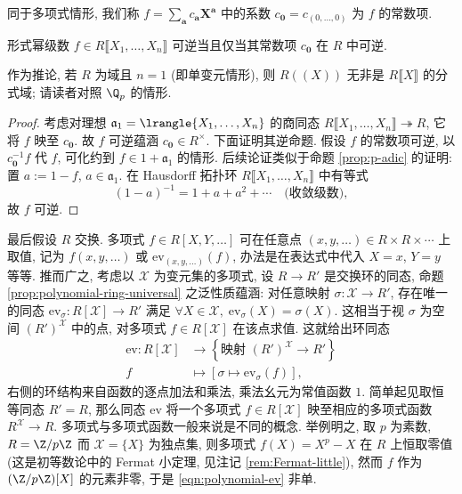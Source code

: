 同于多项式情形, 我们称 $f = \sum_{\bm{a}} c_{\bm{a}} \bm{X}^{\bm{a}}$ 中的系数 $c_{\bm{0}} = c_{(0, \ldots, 0)}$ 为 $f$ 的常数项.

\begin{proposition}
	形式幂级数 $f \in R\llbracket X_1, \ldots, X_n \rrbracket$ 可逆当且仅当其常数项 $c_{\bm{0}}$ 在 $R$ 中可逆.
\end{proposition}
作为推论, 若 $R$ 为域且 $n=1$ (即单变元情形), 则 $R(\!(X)\!)$ 无非是 $R \llbracket X \rrbracket$ 的分式域; 请读者对照 $\Q_p$ 的情形.

\begin{proof}
	考虑对理想 $\mathfrak{a}_1 = \lrangle{X_1, \ldots, X_n}$ 的商同态 $R\llbracket X_1, \ldots, X_n \rrbracket \twoheadrightarrow R$, 它将 $f$ 映至 $c_{\bm{0}}$. 故 $f$ 可逆蕴涵 $c_{\bm{0}} \in R^\times$. 下面证明其逆命题. 假设 $f$ 的常数项可逆, 以 $c_{\bm{0}}^{-1} f$ 代 $f$, 可化约到 $f \in 1 + \mathfrak{a}_1$ 的情形. 后续论证类似于命题 \ref{prop:p-adic} 的证明: 置 $a := 1 - f$, $a \in \mathfrak{a}_1$. 在 Hausdorff 拓扑环 $R \llbracket X_1, \ldots, X_n \rrbracket$ 中有等式
	\[ (1-a)^{-1} = 1 + a + a^2 + \cdots \quad \text{(收敛级数)}, \]
	故 $f$ 可逆.
\end{proof}

最后假设 $R$ 交换. 多项式 $f \in R[X,Y,\ldots]$ 可在任意点 $(x,y, \ldots) \in R \times R \times \cdots$ 上取值, 记为 $f(x,y,\ldots)$ 或 $\text{ev}_{(x,y,\ldots)}(f)$, 办法是在表达式中代入 $X=x$, $Y=y$ 等等. 推而广之, 考虑以 $\mathcal{X}$ 为变元集的多项式, 设 $R \to R'$ 是交换环的同态, 命题 \ref{prop:polynomial-ring-universal} 之泛性质蕴涵: 对任意映射 $\sigma: \mathcal{X} \to R'$, 存在唯一的同态 $\text{ev}_\sigma: R[\mathcal{X}] \to R'$ 满足 $\forall X \in \mathcal{X}, \;\text{ev}_\sigma(X) = \sigma(X)$. 这相当于视 $\sigma$ 为空间 $(R')^\mathcal{X}$ 中的点, 对多项式 $f \in R[\mathcal{X}]$ 在该点求值. 这就给出环同态
\begin{equation}\label{eqn:polynomial-ev}\begin{aligned}
	\text{ev}: R[\mathcal{X}] & \longrightarrow \left\{ \text{映射 } (R')^\mathcal{X} \to R' \right\} \\
	f & \longmapsto \left[ \sigma \mapsto \text{ev}_\sigma(f) \right],
\end{aligned}\end{equation}
右侧的环结构来自函数的逐点加法和乘法, 乘法幺元为常值函数 $1$. 简单起见取恒等同态 $R'=R$, 那么同态 $\text{ev}$ 将一个多项式 $f \in R[\mathcal{X}]$ 映至相应的多项式函数 $R^\mathcal{X} \to R$. 多项式与多项式函数一般来说是不同的概念. 举例明之, 取 $p$ 为素数, $R = \Z/p\Z$ 而 $\mathcal{X} = \{X\}$ 为独点集, 则多项式 $f(X) = X^p - X$ 在 $R$ 上恒取零值 (这是初等数论中的 Fermat 小定理, 见注记 \ref{rem:Fermat-little}), 然而 $f$ 作为 $(\Z/p\Z)[X]$ 的元素非零, 于是 \eqref{eqn:polynomial-ev} 非单.

